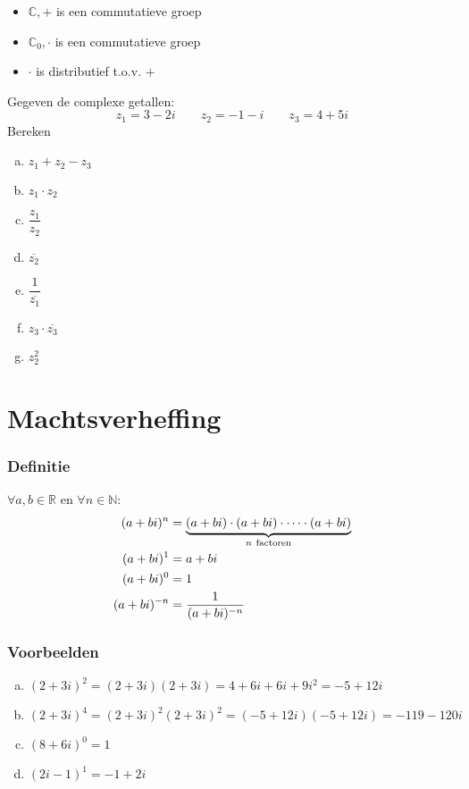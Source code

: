 \documentclass[12pt,twoside,a4paper]{article}
\begin{document}
\begin{itemize}
  \item $\mathbb{C},+$ is een commutatieve groep
  \item $\mathbb{C}_0,\cdot$ is een commutatieve groep
  \item $\cdot$ is distributief t.o.v. $+$
\end{itemize}

\begin{oefening}
  Gegeven de complexe getallen:
  $$z_1=3-2i \qquad z_2=-1-i \qquad z_3=4+5i$$
  Bereken
  \begin{multicols}{2}
    \begin{enumerate}[(a)]
      \itemsep 1em
    \item $\displaystyle z_1+z_2-z_3$
    \item $\displaystyle z_1\cdot z_2$
    \item $\displaystyle \dfrac{z_1}{z_2}$
    \item $\displaystyle \overline{z_2}$
    \item $\displaystyle \dfrac{1}{\overline{z_1}}$
    \item $\displaystyle z_3\cdot \overline{z_3}$
    \item $\displaystyle z_2^2$
    \end{enumerate}
  \end{multicols}
\end{oefening}

\cleardoublepage
\section{Machtsverheffing}

\subsubsection*{Definitie}
\begin{mdframed}
  $\forall a,b\in\mathbb{R}$ en $\forall n\in\mathbb{N}$:
  \begin{align*}
    (a+bi)^n &= \underbrace{(a+bi)\cdot(a+bi)\cdot\cdots\cdot(a+bi)}_{n\mbox{ \scriptsize factoren}}\\
    (a+bi)^1 &= a+bi\\
    (a+bi)^0 &= 1\\
    (a+bi)^{-n} &= \dfrac{1}{(a+bi)^{-n}}
  \end{align*}
\end{mdframed}

\subsubsection*{Voorbeelden}
\begin{enumerate}[(a)]
  \item $(2+3i)^2=(2+3i)(2+3i)=4+6i+6i+9i^2=-5+12i$
  \item $(2+3i)^4=(2+3i)^2(2+3i)^2=(-5+12i)(-5+12i)=-119-120i$
  \item $(8+6i)^0=1$
  \item $(2i-1)^1=-1+2i$
\end{enumerate}
\end{document}
